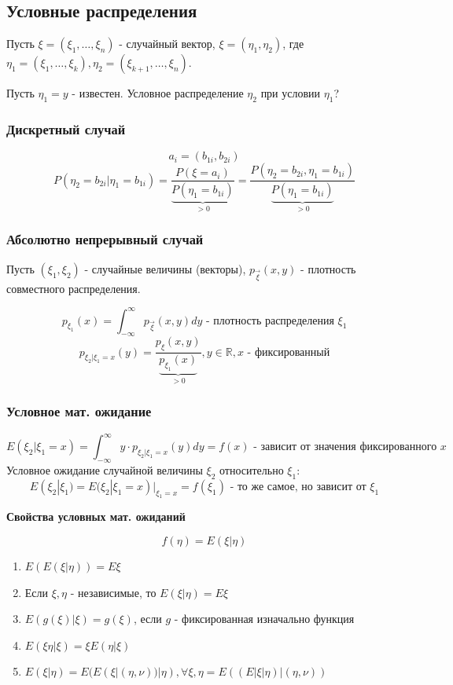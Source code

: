 \subsection{Условные распределения}
Пусть $\xi = (\xi_1,\dots,\xi_n)$ - случайный вектор, $\xi = (\eta_1, \eta_2)$, где $\eta_1=(\xi_1,\dots,\xi_k), \eta_2=(\xi_{k+1},\dots,\xi_n)$.

Пусть $\eta_1=y$ - известен. Условное распределение $\eta_2$ при условии $\eta_1$?
\subsubsection{Дискретный случай}
\[a_i=(b_{1i}, b_{2i})\]
\[P(\eta_2=b_{2i} | \eta_1=b_{1i})=\dfrac{P(\xi=a_i)}{\underbrace{P(\eta_1=b_{1i})}_{>0}} = \dfrac{P(\eta_2=b_{2i}, \eta_1=b_{1i})}{\underbrace{P(\eta_1=b_{1i})}_{>0}} \]

\subsubsection{Абсолютно непрерывный случай}
Пусть $(\xi_1, \xi_2)$ - случайные величины (векторы), $p_{\vec{\xi}}(x,y)$ - плотность совместного распределения.

\[p_{\xi_1}(x)=\int_{-\infty}^{\infty} p_{\vec{\xi}}(x,y)dy \text{ - плотность распределения } \xi_1\]
\[p_{\xi_2|\xi_1=x}(y)=\dfrac{p_\xi(x,y)}{\underbrace{p_{\xi_1}(x)}_{>0}}, y\in \mathbb{R}, x \text{ - фиксированный}\]

\subsubsection{Условное мат. ожидание}
\[E(\xi_2|\xi_1=x)=\int_{-\infty}^{\infty} y \cdot p_{\xi_2|\xi_1=x}(y)dy = f(x) \text{ - зависит от значения фиксированного } x\]
Условное ожидание случайной величины $\xi_2$ относительно $\xi_1$:
\[E(\xi_2|\xi_1)=E(\xi_2|\xi_1=x)|_{\xi_1=x}=f(\xi_1) \text{ - то же самое, но зависит от } \xi_1\]

\begin{center}
	\textbf{Свойства условных мат. ожиданий}
\end{center}
\[f(\eta)=E(\xi|\eta)\]
\begin{enumerate}
	\item $E(E(\xi|\eta))=E\xi$
	\item Если $\xi, \eta$ - независимые, то $E(\xi|\eta)=E\xi$
	\item $E(g(\xi)|\xi)=g(\xi)$, если $g$ - фиксированная изначально функция
	\item $E(\xi\eta|\xi)=\xi E(\eta|\xi)$
	\item $E(\xi|\eta)=E(E(\xi|(\eta,\nu))|\eta), \forall \xi,\eta=E((E|\xi|\eta)|(\eta,\nu))$
\end{enumerate}

